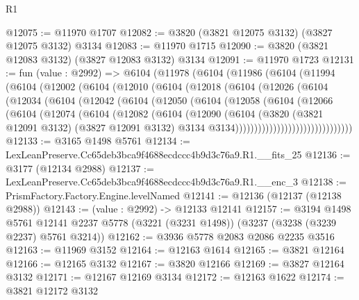 \begin{lexlean}{R1}
\begin{coremodule}
@12075 := @11970 @1707
@12082 := @3820 (@3821 @12075 @3132) (@3827 @12075 @3132) @3134
@12083 := @11970 @1715
@12090 := @3820 (@3821 @12083 @3132) (@3827 @12083 @3132) @3134
@12091 := @11970 @1723
@12131 := fun (value : @2992) =>
  @6104
    (@11978
      (@6104
        (@11986
          (@6104
            (@11994
              (@6104
                (@12002
                  (@6104
                    (@12010
                      (@6104
                        (@12018
                          (@6104
                            (@12026
                              (@6104
                                (@12034
                                  (@6104
                                    (@12042
                                      (@6104
                                        (@12050
                                          (@6104
                                            (@12058
                                              (@6104
                                                (@12066
                                                  (@6104
                                                    (@12074
                                                      (@6104
                                                        (@12082
                                                          (@6104
                                                            (@12090
                                                              (@6104
                                                                (@3820
                                                                  (@3821 @12091 @3132)
                                                                  (@3827 @12091 @3132)
                                                                  @3134
                                                                  @3134)))))))))))))))))))))))))))))))
@12133 := @3165 @1498 @5761
@12134 := LexLeanPreserve.Cc65deb3bca9f4688ecdccc4b9d3c76a9.R1.__fits_25
@12136 := @3177 (@12134 @2988)
@12137 := LexLeanPreserve.Cc65deb3bca9f4688ecdccc4b9d3c76a9.R1.__enc_3
@12138 := PrismFactory.Factory.Engine.levelNamed
@12141 := @12136 (@12137 (@12138 @2988))
@12143 := (value : @2992) -> @12133 @12141
@12157 := @3194
    @1498
    @5761
    @12141
    @2237
    @5778
    (@3221 (@3231 @1498))
    (@3237 (@3238 (@3239 @2237) @5761 @3214))
@12162 := @3936 @5778 @2083 @2086 @2235 @3516
@12163 := @11969 @3152
@12164 := @12163 @1614
@12165 := @3821 @12164
@12166 := @12165 @3132
@12167 := @3820 @12166
@12169 := @3827 @12164 @3132
@12171 := @12167 @12169 @3134
@12172 := @12163 @1622
@12174 := @3821 @12172 @3132

\end{coremodule}
\end{lexlean}
